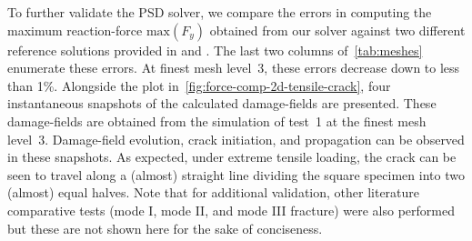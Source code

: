 To further validate  the PSD solver, we compare the errors in computing the maximum reaction-force $\text{max}(F_y)$ obtained from our solver against two different reference solutions provided in \cite{Ambati2014} and \cite{amor2009regularized}.
The last two columns of~\cref{tab:meshes} enumerate these errors. At finest mesh level~3, these errors decrease down to less than 1\si{\percent}. 
Alongside the plot in~\cref{fig:force-comp-2d-tensile-crack}, four instantaneous snapshots of the calculated damage-fields are presented. These damage-fields are obtained from the  simulation of test~1 at the finest mesh level~3. Damage-field evolution, crack initiation, and propagation can be observed in these snapshots. As expected, under extreme tensile loading, the crack can be seen to travel along  a (almost) straight line dividing the square specimen into two (almost) equal halves. Note that for additional validation, other literature comparative tests (mode I, mode II, and mode III fracture) were also performed but these are not shown here for the sake of conciseness.                        
%
